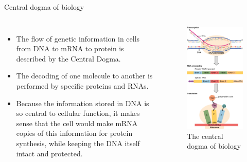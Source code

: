 \documentclass[11pt,dvipsnames,ignorenonframetext,aspectratio=169]{beamer}
\providecommand{\tightlist}{%
  \setlength{\itemsep}{0pt}\setlength{\parskip}{0pt}}
\newcommand{\bcolumns}{\begin{columns}[T, onlytextwidth]}
\newcommand{\ecolumns}{\end{columns}}
\begin{document}
\begin{frame}{Central dogma of biology}
\protect\hypertarget{central-dogma-of-biology}{}
\bcolumns
{}

\begin{itemize}
\tightlist
\item
  The flow of genetic information in cells from DNA to mRNA to protein
  is described by the Central Dogma.
\item
  The decoding of one molecule to another is performed by specific
  proteins and RNAs.
\item
  Because the information stored in DNA is so central to cellular
  function, it makes sense that the cell would make mRNA copies of this
  information for protein synthesis, while keeping the DNA itself intact
  and protected.
\end{itemize}


\begin{figure}
\includegraphics[width=0.6\linewidth]{./../images/central_dogma_genetics} \caption{The central dogma of biology}\label{fig:central-dogma}
\end{figure}

\ecolumns
\end{frame}
\end{document}
